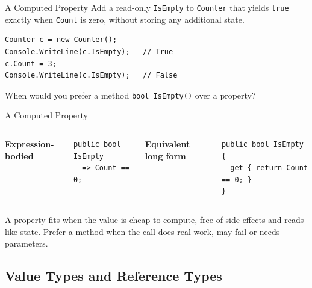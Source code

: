 \begin{exerciseframe}{A Computed Property}
  Add a read-only \texttt{IsEmpty} to \texttt{Counter} that yields
  \texttt{true} exactly when \texttt{Count} is zero, without storing any
  additional state.
  \begin{lstlisting}
Counter c = new Counter();
Console.WriteLine(c.IsEmpty);   // True
c.Count = 3;
Console.WriteLine(c.IsEmpty);   // False
  \end{lstlisting}
  When would you prefer a method \texttt{bool IsEmpty()} over a property?
\end{exerciseframe}

\begin{solutionframe}{A Computed Property}
  \begin{columns}[T]
      \textbf{Expression-bodied}
      \begin{lstlisting}
public bool IsEmpty
  => Count == 0;
      \end{lstlisting}
      \textbf{Equivalent long form}
      \begin{lstlisting}
public bool IsEmpty
{
  get { return Count == 0; }
}
      \end{lstlisting}
  \end{columns}
  A property fits when the value is cheap to compute, free of side effects and
  reads like state. Prefer a method when the call does real work, may fail or
  needs parameters.
  \vspace{3ex}

\end{solutionframe}

\subsection{Value Types and Reference Types}

